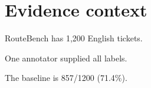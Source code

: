 \section{Evidence context}
RouteBench has 1,200 English tickets.

One annotator supplied all labels.

The baseline is 857/1200 (71.4\%).

